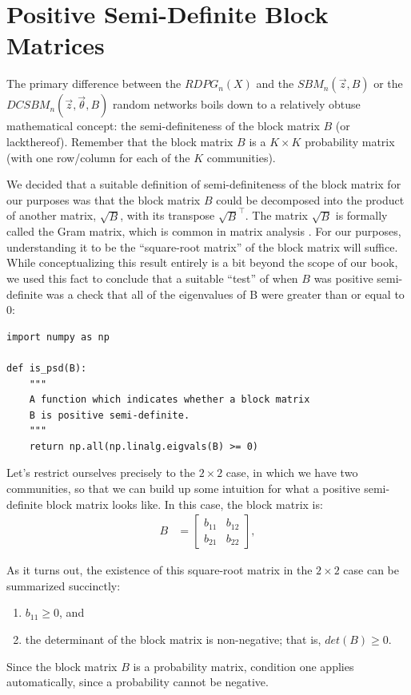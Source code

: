 \section{Positive Semi-Definite Block Matrices}
\label{sec:ch5:psd_block}

The primary difference between the $RDPG_n(X)$ and the $SBM_n(\vec z, B)$ or the $DCSBM_n(\vec z, \vec \theta, B)$ random networks boils down to a relatively obtuse mathematical concept: the semi-definiteness of the block matrix $B$ (or lackthereof). Remember that the block matrix $B$ is a $K \times K$ probability matrix (with one row/column for each of the $K$ communities).

We decided that a suitable definition of semi-definiteness of the block matrix for our purposes was that the block matrix $B$ could be decomposed into the product of another matrix, $\sqrt B$, with its transpose $\sqrt B^\top$. The matrix $\sqrt B$ is formally called the Gram matrix, which is common in matrix analysis \cite{Horn2012Oct}. For our purposes, understanding it to be the ``square-root matrix'' of the block matrix will suffice. While conceptualizing this result entirely is a bit beyond the scope of our book, we used this fact to conclude that a suitable ``test'' of when $B$ was positive semi-definite was a check that all of the eigenvalues of B were greater than or equal to 0:

\begin{lstlisting}[style=python]
import numpy as np

def is_psd(B):
    """
    A function which indicates whether a block matrix
    B is positive semi-definite.
    """
    return np.all(np.linalg.eigvals(B) >= 0)
\end{lstlisting}

Let's restrict ourselves precisely to the $2 \times 2$ case, in which we have two communities, so that we can build up some intuition for what a positive semi-definite block matrix looks like. In this case, the block matrix is:
\begin{align*}
    B &= \begin{bmatrix}
        b_{11} & b_{12} \\
        b_{21} & b_{22}
    \end{bmatrix},
\end{align*}

As it turns out, the existence of this square-root matrix in the $2 \times 2$ case can be summarized succinctly:
\begin{enumerate}
    \item $b_{11} \geq 0$, and
    \item the determinant of the block matrix is non-negative; that is, $det(B) \geq 0$.
\end{enumerate}
Since the block matrix $B$ is a probability matrix, condition one applies automatically, since a probability cannot be negative. 


